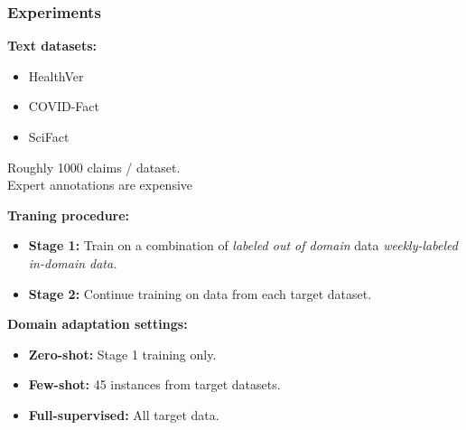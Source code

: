 \documentclass[13.5pt,aspecratio=169, xcolor=dvipsnames]{beamer}
\begin{document}
\begin{frame}
\onehalfspacing
    \frametitle{Experiments}
    \begin{minipage}{0.3\textwidth}
        \textbf{Text datasets:}
        \begin{itemize}
            \item HealthVer
            \item COVID-Fact
            \item SciFact
        \end{itemize}
    \end{minipage}
    \begin{minipage}{0.69\textwidth}
         {
        \begin{minipage}{0.75\textwidth}
            \begin{block}{}
                \hspace{0.5em} Roughly 1000 claims / dataset. \\
                \hspace{0.5em} Expert annotations are expensive
            \end{block}
        \end{minipage} 
        }
    \end{minipage}

    \bigskip
     {
        \textbf{Traning procedure:}
        \begin{itemize}
            \item \textbf{Stage 1:} Train on a combination of \textit{labeled out of domain} data \textit{weekly-labeled in-domain data.}
            \item \textbf{Stage 2:} Continue training on data from each target dataset. 
        \end{itemize}
    }
    \bigskip
    \vspace*{-1em}
     {
        \textbf{Domain adaptation settings:}
        \begin{itemize}
            \item \textbf{Zero-shot:} Stage 1 training only.
            \item \textbf{Few-shot:} 45 instances from target datasets.
            \item \textbf{Full-supervised:} All target data.
        \end{itemize}
    }



\end{frame}
\end{document}
